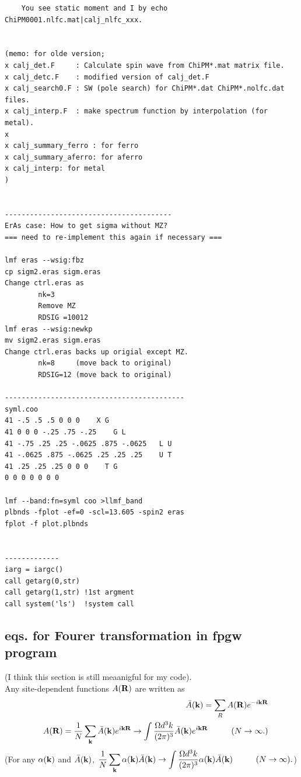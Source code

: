 \documentclass[a4paper,10pt,epsf,fleqn]{article}
\newcommand{\bfk}{{\bf k}}
\newcommand{\bfR}{{\bf R}}
\begin{document}
\begin{verbatim}
    You see static moment and I by echo ChiPM0001.nlfc.mat|calj_nlfc_xxx.


(memo: for olde version;
x calj_det.F     : Calculate spin wave from ChiPM*.mat matrix file.
x calj_detc.F    : modified version of calj_det.F
x calj_search0.F : SW (pole search) for ChiPM*.dat ChiPM*.nolfc.dat files.
x calj_interp.F  : make spectrum function by interpolation (for metal).
x
x calj_summary_ferro : for ferro 
x calj_summary_aferro: for aferro
x calj_interp: for metal
)


----------------------------------------
ErAs case: How to get sigma without MZ?
=== need to re-implement this again if necessary ===

lmf eras --wsig:fbz
cp sigm2.eras sigm.eras
Change ctrl.eras as
        nk=3
        Remove MZ
        RDSIG =10012
lmf eras --wsig:newkp
mv sigm2.eras sigm.eras
Change ctrl.eras backs up origial except MZ.
        nk=8     (move back to original)
        RDSIG=12 (move back to original)

-------------------------------------------
syml.coo
41 -.5 .5 .5 0 0 0    X G
41 0 0 0 -.25 .75 -.25    G L
41 -.75 .25 .25 -.0625 .875 -.0625   L U
41 -.0625 .875 -.0625 .25 .25 .25    U T
41 .25 .25 .25 0 0 0    T G
0 0 0 0 0 0 0

lmf --band:fn=syml coo >llmf_band
plbnds -fplot -ef=0 -scl=13.605 -spin2 eras
fplot -f plot.plbnds


-------------
iarg = iargc()
call getarg(0,str)
call getarg(1,str) !1st argment
call system('ls')  !system call

\end{verbatim}



\newpage

\subsection{eqs. for Fourer transformation in {\bf fpgw} program}

(I think this section is still meaanigful for my code).\\

Any site-dependent functions $A(\bfR)$ are written as
\begin{eqnarray}
&& \bar{A}(\bfk) = \sum_{R} A(\bfR) e^{-i \bfk \bfR} \\
&& A(\bfR) = \frac{1}{N} \sum_{\bfk} \bar{A}(\bfk) e^{i \bfk \bfR}
\rightarrow \int \frac{\Omega d^3 k  }{(2 \pi)^3} \bar{A}(\bfk) e^{i \bfk \bfR} 
\hspace{1cm}(N \to \infty.) 
\end{eqnarray}
(For any $\alpha(\bfk)$ and $\bar{A}(\bfk)$, 
$ \displaystyle
\frac{1}{N} \sum_{\bfk} \alpha(\bfk) \bar{A}(\bfk) 
\rightarrow \int \frac{\Omega d^3 k  }{(2 \pi)^3} 
\alpha(\bfk) \bar{A}(\bfk) \hspace{1cm}(N \to \infty).
$)
\end{document}
